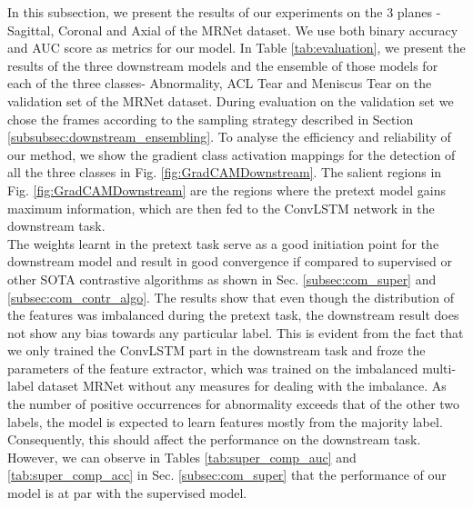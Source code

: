 \documentclass[journal]{IEEEtai}
\begin{document}
In this subsection, we present the results of our experiments on the 3 planes - Sagittal, Coronal and Axial of the MRNet dataset. We use both binary accuracy and AUC score as metrics for our model. In Table \ref{tab:evaluation}, we present the results of the three downstream models and the ensemble of those models for each of the three classes- Abnormality, ACL Tear and Meniscus Tear on the validation set of the MRNet dataset. During evaluation on the validation set we chose the frames according to the sampling strategy described in Section \ref{subsubsec:downstream_ensembling}. To analyse the efficiency and reliability of our method, we show the gradient class activation mappings \cite{gradcam} for the detection of all the three classes in Fig. \ref{fig:GradCAMDownstream}. The salient regions in Fig. \ref{fig:GradCAMDownstream} are the regions where the pretext model gains maximum information, which are then fed to the ConvLSTM network in the downstream task.\\
\indent
The weights learnt in the pretext task serve as a good initiation point for the downstream model and result in good convergence if compared to supervised or other SOTA contrastive algorithms as shown in Sec. \ref{subsec:com_super} and \ref{subsec:com_contr_algo}. The results show that even though the distribution of the features was imbalanced during the pretext task, the downstream result does not show any bias towards any particular label. This is evident from the fact that we only trained the ConvLSTM part in the downstream task and froze the parameters of the feature extractor, which was trained on the imbalanced multi-label dataset MRNet without any measures for dealing with the imbalance. As the number of positive occurrences for abnormality exceeds that of the other two labels, the model is expected to learn features mostly from the majority label. Consequently, this should affect the performance on the downstream task. However, we can observe in Tables \ref{tab:super_comp_auc} and \ref{tab:super_comp_acc} in Sec. \ref{subsec:com_super} that the performance of our model is at par with the supervised model.
\end{document}
